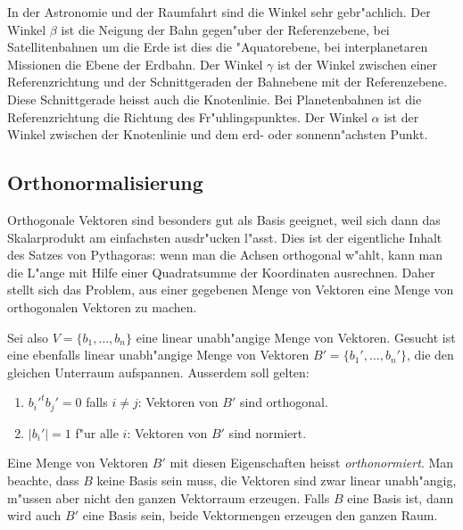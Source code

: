 In der Astronomie und der Raumfahrt sind die Winkel sehr gebr"achlich.
Der Winkel $\beta$ ist die Neigung der Bahn gegen"uber der Referenzebene,
bei Satellitenbahnen um die Erde ist dies die "Aquatorebene,
bei interplanetaren Missionen die Ebene der Erdbahn.
Der Winkel $\gamma$ ist der Winkel zwischen einer Referenzrichtung
und der Schnittgeraden der Bahnebene mit der Referenzebene.
Diese Schnittgerade heisst auch die Knotenlinie.
Bei Planetenbahnen ist die Referenzrichtung die Richtung des Fr"uhlingspunktes.
Der Winkel $\alpha$ ist der Winkel zwischen der Knotenlinie und dem
erd- oder sonnenn"achsten Punkt.



\subsection{Orthonormalisierung}
Orthogonale Vektoren sind besonders gut als Basis geeignet, weil
sich dann das Skalarprodukt am einfachsten ausdr"ucken l"asst.
Dies ist der eigentliche Inhalt des Satzes von Pythagoras: wenn
man die Achsen orthogonal w"ahlt, kann man die L"ange mit Hilfe
einer Quadratsumme der Koordinaten ausrechnen. Daher stellt sich 
das Problem, aus einer gegebenen Menge von Vektoren eine Menge
von orthogonalen Vektoren zu machen.

Sei also $V=\{b_1,\dots,b_n\}$ eine linear unabh"angige Menge von
Vektoren. Gesucht ist eine ebenfalls linear unabh"angige Menge 
von Vektoren $B'=\{b_1',\dots,b_n'\}$, die den gleichen Unterraum
aufspannen.
Ausserdem soll gelten:
\begin{enumerate}
\item $b_i'^tb_j'=0$ falls $i\ne j$: Vektoren von $B'$ sind orthogonal.
\item $|b_i'|=1$ f"ur alle $i$: Vektoren von $B'$ sind normiert.
\end{enumerate}
Eine Menge von Vektoren $B'$ mit diesen Eigenschaften heisst
{\it orthonormiert}.
Man beachte, dass $B$ keine Basis sein muss, die Vektoren sind zwar
linear unabh"angig, m"ussen aber nicht den ganzen Vektorraum erzeugen. 
Falls $B$ eine Basis ist, dann wird auch $B'$ eine Basis sein, beide
Vektormengen erzeugen den ganzen Raum.

